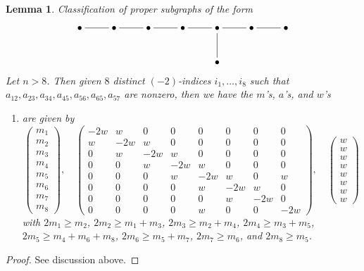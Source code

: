 \documentclass{stacks-project}
\theoremstyle{plain}
\newtheorem{lemma}[subsection]{Lemma}
\theoremstyle{definition}
\theoremstyle{remark}
\numberwithin{equation}{subsection}
\begin{document}
\begin{lemma}
\label{lemma-E8}
Classification of proper subgraphs of the form
$$
\xymatrix{
\bullet \ar@{-}[r] & \bullet \ar@{-}[r] & \bullet \ar@{-}[r] &
\bullet \ar@{-}[r] & \bullet \ar@{-}[r] \ar@{-}[d] &
\bullet \ar@{-}[r] & \bullet \\
& & & & \bullet
}
$$
Let $n > 8$. Then given $8$ distinct $(-2)$-indices $i_1, \ldots, i_8$
such that $a_{12}, a_{23}, a_{34}, a_{45}, a_{56}, a_{65}, a_{57}$
are nonzero, then we have the $m$'s, $a$'s, and $w$'s
\begin{enumerate}
\item
\label{item-E8}
are given by
$$
\left(
\begin{matrix}
m_1 \\
m_2 \\
m_3 \\
m_4 \\
m_5 \\
m_6 \\
m_7 \\
m_8
\end{matrix}
\right),
\quad
\left(
\begin{matrix}
-2w & w & 0 & 0 & 0 & 0 & 0 & 0 \\
w & -2w & w & 0 & 0 & 0 & 0 & 0 \\
0 & w & -2w & w & 0 & 0 & 0 & 0 \\
0 & 0 & w & -2w & w & 0 & 0 & 0 \\
0 & 0 & 0 & w & -2w & w & 0 & w \\
0 & 0 & 0 & 0 & w & -2w & w & 0 \\
0 & 0 & 0 & 0 & 0 & w & -2w & 0 \\
0 & 0 & 0 & 0 & w & 0 & 0 & -2w
\end{matrix}
\right),
\quad
\left(
\begin{matrix}
w \\
w \\
w \\
w \\
w \\
w \\
w \\
w
\end{matrix}
\right)
$$
with $2m_1 \geq m_2$, $2m_2 \geq m_1 + m_3$, $2m_3 \geq m_2 + m_4$,
$2m_4 \geq m_3 + m_5$, $2m_5 \geq m_4 + m_6 + m_8$, $2m_6 \geq m_5 + m_7$,
$2m_7 \geq m_6$, and $2m_8 \geq m_5$.
\end{enumerate}
\end{lemma}

\begin{proof}
See discussion above.
\end{proof}
\end{document}
